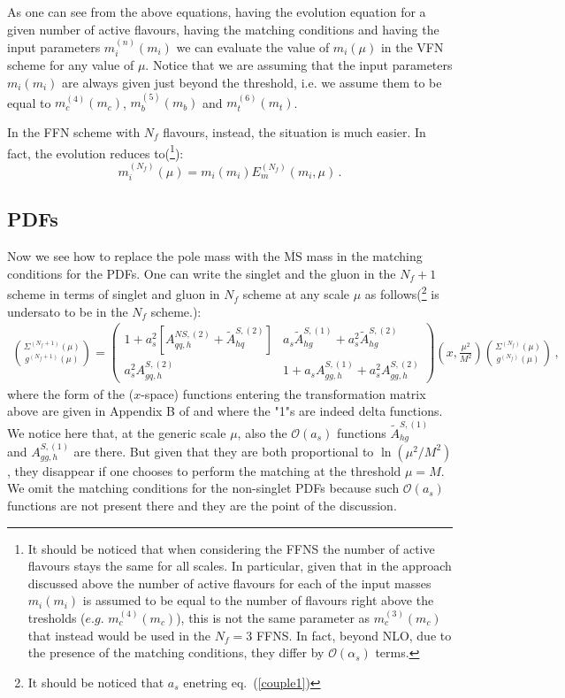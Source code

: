 \documentclass[10pt,a4paper]{article}
\begin{document}
As one can see from the above equations, having the evolution equation for a given number of active flavours, having the matching conditions and having the input parameters $m_i^{(n)}(m_i)$ we can evaluate the value of $m_i(\mu)$ in the VFN scheme for any value of $\mu$. Notice that we are assuming that the input parameters $m_i(m_i)$ are always given just beyond the threshold, i.e. we assume them to be equal to $m_c^{(4)}(m_c)$, $m_b^{(5)}(m_b)$ and $m_t^{(6)}(m_t)$. 

In the FFN scheme with $N_f$ flavours, instead, the situation is much
easier. In fact, the evolution reduces to(\footnote{It should be
  noticed that when considering the FFNS the number of active flavours
  stays the same for all scales. In particular, given that in the
  approach discussed above the number of active flavours for each of
  the input masses $m_i(m_i)$ is assumed to be equal to the number of
  flavours right above the tresholds ($e.g.$ $m_c^{(4)}(m_c)$), this
  is not the same parameter as $m_c^{(3)}(m_c)$ that instead would be
  used in the $N_f=3$ FFNS. In fact, beyond NLO, due to the presence
  of the matching conditions, they differ by $\mathcal{O}(\alpha_s)$
  terms.}):
\begin{equation}
m_i^{(N_f)}(\mu) = m_i(m_i)E_m^{(N_f)}(m_i,\mu)\,.
\end{equation} 


\subsection{PDFs}

Now we see how to replace the pole mass with the
$\overline{\mbox{MS}}$ mass in the matching conditions for the
PDFs. One can write the singlet and the gluon in the $N_f+1$ scheme in
terms of singlet and gluon in $N_f$ scheme at any scale $\mu$ as
follows(\footnote{It should be noticed that $a_s$ enetring
  eq.~(\ref{couple1})} is undersato to be in the $N_f$ scheme.):
\begin{equation}
\begin{array}{c}
\displaystyle {\Sigma^{(N_f+1)}(\mu) \choose g^{(N_f+1)}(\mu)}=\begin{pmatrix}1+a_s^2[A_{qq,h}^{N\!S,(2)}+\tilde{A}^{S,(2)}_{hq}] & a_s\tilde{A}^{S,(1)}_{hg}+a_s^2\tilde{A}^{S,(2)}_{hg}\\
a_s^2A^{S,(2)}_{gq,h} & 1+a_sA_{gg,h}^{S,(1)}+a_s^2A_{gg,h}^{S,(2)}\end{pmatrix}\left(x,\frac{\mu^2}{M^2}\right){\Sigma^{(N_f)}(\mu) \choose g^{(N_f)}(\mu)}\,,
\end{array}
\label{couple1}
\end{equation}
where the form of the ($x$-space) functions entering the
transformation matrix above are given in Appendix B of
\cite{Buza:1996wv} and where the "1"s are indeed delta functions. We
notice here that, at the generic scale $\mu$, also the
$\mathcal{O}(a_s)$ functions $\tilde{A}^{S,(1)}_{hg}$ and
$A_{gg,h}^{S,(1)}$ are there. But given that they are both
proportional to $\ln(\mu^2/M^2)$, they disappear if one chooses to
perform the matching at the threshold $\mu=M$. We omit the matching
conditions for the non-singlet PDFs because such $\mathcal{O}(a_s)$
functions are not present there and they are the point of the
discussion.
\end{document}
